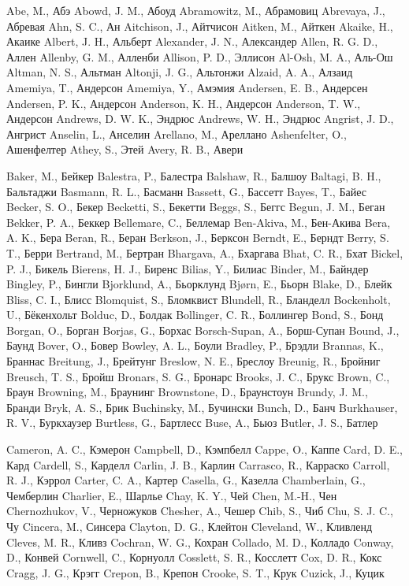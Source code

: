 Abe, M., Абэ
Abowd, J. M., Абоуд
Abramowitz, M., Абрамовиц
Abrevaya, J., Абревая
Ahn, S. C., Ан
Aitchison, J., Айтчисон
Aitken, M., Айткен
Akaike, H., Акаике
Albert, J. H., Альберт
Alexander, J. N., Александер
Allen, R. G. D., Аллен
Allenby, G. M., Алленби
Allison, P. D., Эллисон
Al-Osh, M. A., Аль-Ош
Altman, N. S., Альтман
Altonji, J. G.,  Альтонжи
Alzaid, A. A., Алзаид
Amemiya, T., Андерсон
Amemiya, Y., Амэмия
Andersen, E. B., Андерсен
Andersen, P. K., Андерсон
Anderson, K. H., Андерсон
Anderson, T. W., Андерсон
Andrews, D. W. K., Эндрюс
Andrews, W. H., Эндрюс
Angrist, J. D., Ангрист
Anselin, L., Анселин
Arellano, M., Ареллано
Ashenfelter, O., Ашенфелтер
Athey, S., Этей
Avery, R. B., Авери

Baker, M., Бейкер
Balestra, P., Балестра
Balshaw, R., Балшоу
Baltagi, B. H., Бальтаджи
Basmann, R. L., Басманн
Bassett, G., Бассетт
Bayes, T., Байес
Becker, S. O., Бекер
Becketti, S., Бекетти
Beggs, S., Беггс
Begun, J. M., Беган
Bekker, P. A., Беккер
Bellemare, C., Беллемар
Ben-Akiva, M., Бен-Акива
Bera, A. K., Бера
Beran, R., Беран
Berkson, J., Берксон
Berndt, E., Берндт
Berry, S. T., Берри
Bertrand, M., Бертран
Bhargava, A., Бхаргава
Bhat, C. R., Бхат
Bickel, P. J., Бикель
Bierens, H. J., Биренс
Bilias, Y., Билиас
Binder, M., Байндер
Bingley, P., Бингли
Bjorklund, A., Бьорклунд
Bjørn, E., Бьорн
Blake, D., Блейк
Bliss, C. I., Блисс
Blomquist, S., Бломквист
Blundell, R., Бланделл 
Bockenholt, U., Бёкенхольт
Bolduc, D., Болдак
Bollinger, C. R., Боллингер
Bond, S., Бонд
Borgan, O., Борган
Borjas, G., Борхас
Borsch-Supan, A., Борш-Супан 
Bound, J., Баунд 
Bover, O., Бовер
Bowley, A. L., Боули 
Bradley, P., Брэдли
Brannas, K., Браннас
Breitung, J., Брейтунг
Breslow, N. E., Бреслоу
Breunig, R., Бройниг
Breusch, T. S., Бройш
Bronars, S. G., Бронарс
Brooks, J. C., Брукс
Brown, C., Браун 
Browning, M., Браунинг
Brownstone, D., Браунстоун
Brundy, J. M., Бранди
Bryk, A. S., Брик
Buchinsky, M., Бучински  
Bunch, D., Банч
Burkhauser, R. V., Буркхаузер
Burtless, G., Бартлесс
Buse, A., Бьюз
Butler, J. S., Батлер

Cameron, A. C., Кэмерон
Campbell, D., Кэмпбелл
Cappe, O., Каппе
Card, D. E., Кард 
Cardell, S., Карделл
Carlin, J. B., Карлин
Carrasco, R., Карраско
Carroll, R. J., Кэррол
Carter, C. A., Картер
Casella, G., Казелла
Chamberlain, G., Чемберлин
Charlier, E., Шарлье
Chay, K. Y., Чей
Chen, M.-H., Чен
Chernozhukov, V., Черножуков
Chesher, A., Чешер
Chib, S., Чиб
Chu, S. J. C., Чу
Cincera, M., Синсера
Clayton, D. G., Клейтон
Cleveland, W., Кливленд
Cleves, M. R., Кливз
Cochran, W. G., Кохран
Collado, M. D., Колладо
Conway, D., Конвей
Cornwell, C., Корнуолл
Cosslett, S. R., Косслетт
Cox, D. R., Кокс 
Cragg, J. G., Крэгг
Crepon, B., Крепон
Crooke, S. T., Крук
Cuzick, J., Куцик

